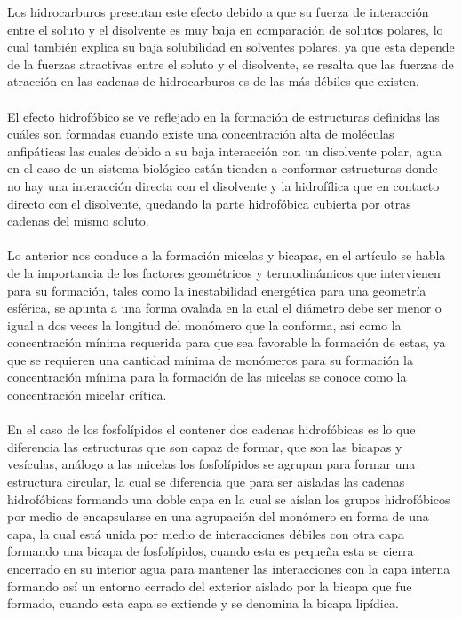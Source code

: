 \documentclass[10pt]{article}
\newcommand{\np}[1]{\paragraph{\normalfont{#1}}}
\begin{document}
    Los hidrocarburos presentan este efecto debido a que su fuerza de interacción entre el soluto y el disolvente es muy baja en comparación de solutos polares, lo cual también explica su baja solubilidad en solventes polares, ya que esta depende de la fuerzas atractivas entre el soluto y el disolvente, se resalta que las fuerzas de atracción en las cadenas de hidrocarburos es de las más débiles que existen.\np{}
    
    El efecto hidrofóbico se ve reflejado en la formación de estructuras definidas las cuáles son formadas cuando existe una concentración alta de moléculas anfipáticas las cuales debido a su baja interacción con un disolvente polar, agua en el caso de un sistema biológico están tienden a conformar estructuras donde no hay una interacción directa con el disolvente y la hidrofílica que en contacto directo con el disolvente, quedando la parte hidrofóbica cubierta por otras cadenas del mismo soluto. \np{}
    
    Lo anterior nos conduce a la formación micelas y bicapas, en el artículo se habla de la importancia de los factores geométricos y termodinámicos que intervienen para su formación, tales como la inestabilidad energética para una geometría esférica, se apunta a una forma ovalada en la cual el diámetro debe ser menor o igual a dos veces la longitud del monómero que la conforma, así como la concentración mínima requerida para que sea favorable la formación de estas, ya que se requieren una cantidad mínima de monómeros para su formación la concentración mínima para la formación de las micelas se conoce como la concentración micelar crítica. \np{}

    En el caso de los fosfolípidos el contener dos cadenas hidrofóbicas es lo que diferencia las estructuras que son capaz de formar, que son las bicapas y vesículas, análogo a las micelas los fosfolípidos se agrupan para formar una estructura circular, la cual se diferencia que para ser aisladas las cadenas hidrofóbicas formando una doble capa en la cual se aíslan los grupos hidrofóbicos por medio de encapsularse en una agrupación del monómero en forma de una capa, la cual está unida por medio de interacciones débiles con otra capa formando una bicapa de fosfolípidos, cuando esta es pequeña esta se cierra encerrado en su interior agua para mantener las interacciones con la capa interna formando así un entorno cerrado del exterior aislado por la bicapa que fue formado, cuando esta capa se extiende y se denomina la bicapa lipídica.\np{}
    
\end{document}
